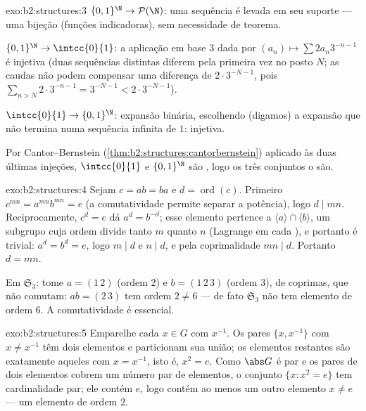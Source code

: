 \begin{solution}{exo:b2:structures:3}
$\{0,1\}^{\N} \to \mathcal{P}(\N)$: uma sequência é levada em seu suporte
--- uma bijeção (funções indicadoras), sem necessidade de teorema.

$\{0,1\}^{\N} \to \intcc{0}{1}$: a aplicação em base $3$ dada por $(a_n) \mapsto
\sum 2a_n 3^{-n-1}$ é injetiva (duas sequências distintas diferem
pela primeira vez no posto $N$; as caudas não podem compensar uma diferença de $2\cdot
3^{-N-1}$, pois $\sum_{n > N} 2\cdot 3^{-n-1} = 3^{-N-1} <
2\cdot3^{-N-1}$).

$\intcc{0}{1} \to \{0,1\}^{\N}$: expansão binária, escolhendo (digamos)
a expansão que não termina numa sequência infinita de $1$: injetiva.

Por Cantor--Bernstein (\cref{thm:b2:structures:cantorbernstein})
aplicado às duas últimas injeções, $\intcc{0}{1}$ e
$\{0,1\}^{\N}$ são , logo os três conjuntos o são.
\end{solution}

\begin{solution}{exo:b2:structures:4}
Sejam $c = ab = ba$ e $d = \operatorname{ord}(c)$. Primeiro $c^{mn} =
a^{mn} b^{mn} = e$ (a comutatividade permite separar a potência), logo $d
\mid mn$. Reciprocamente, $c^d = e$ dá $a^d = b^{-d}$; esse elemento
pertence a $\langle a\rangle \cap \langle b\rangle$, um subgrupo cuja
ordem divide tanto $m$ quanto $n$ (Lagrange em cada ),
e portanto é trivial: $a^d = b^d = e$, logo $m \mid d$ e $n \mid d$, e
pela coprimalidade $mn \mid d$. Portanto $d = mn$.

Em $\mathfrak{S}_3$: tome $a = (1\,2)$ (ordem $2$) e $b =
(1\,2\,3)$ (ordem $3$), de  coprimas, que não comutam: $ab =
(2\,3)$ tem ordem $2 \neq 6$ --- de fato $\mathfrak{S}_3$ não tem
elemento de ordem $6$. A comutatividade é essencial.
\end{solution}

\begin{solution}{exo:b2:structures:5}
Emparelhe cada $x \in G$ com $x^{-1}$. Os pares $\{x, x^{-1}\}$ com
$x \neq x^{-1}$ têm dois elementos e particionam sua união; os
elementos restantes são exatamente aqueles com $x = x^{-1}$, isto é, $x^2 =
e$. Como $\abs G$ é par e os pares de dois elementos cobrem um número
par de elementos, o conjunto $\{x : x^2 = e\}$ tem cardinalidade par;
ele contém $e$, logo contém ao menos um outro elemento $x \neq
e$ --- um elemento de ordem $2$.
\end{solution}

